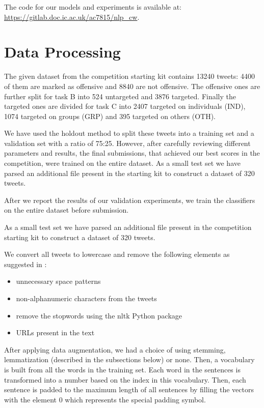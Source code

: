 \documentclass[11pt,a4paper]{article}
\begin{document}
The code for our models and experiments is available at: \url{https://gitlab.doc.ic.ac.uk/ac7815/nlp_cw}.


\section{Data Processing}



The given dataset from the competition starting kit contains 13240 tweets: 4400 of them are marked as offensive and 8840 are not offensive. The offensive ones are further split for task B into 524 untargeted and 3876 targeted. Finally the targeted ones are divided for task C into 2407 targeted on individuals (IND), 1074 targeted on groups (GRP) and 395 targeted on others (OTH).

We have used the holdout method to split these tweets into a training set and a validation set with a ratio of 75:25. However, after carefully reviewing different parameters and results, the final submissions, that achieved our best scores in the competition, were trained on the entire dataset. As a small test set we have parsed an additional file present in the starting kit to construct a dataset of 320 tweets.

After we report the results of our validation experiments, we train the classifiers on the entire dataset before submission.

As a small test set we have parsed an additional file present in the competition starting kit to construct a dataset of 320 tweets.

We convert all tweets to lowercase and remove the following elements as suggested in \cite{preproc}:
\begin{itemize}
    \item unnecessary space patterns
    \item non-alphanumeric characters from the tweets
    \item remove the stopwords using the nltk Python package
    \item URLs present in the text
\end{itemize}

After applying data augmentation, we had a choice of using stemming, lemmatization (described in the subsections below) or none. Then, a vocabulary is built from all the words in the training set. Each word in the sentences is transformed into a number based on the index in this vocabulary. Then, each sentence is padded to the maximum length of all sentences by filling the vectors with the element 0 which represents the special padding symbol.
\end{document}
